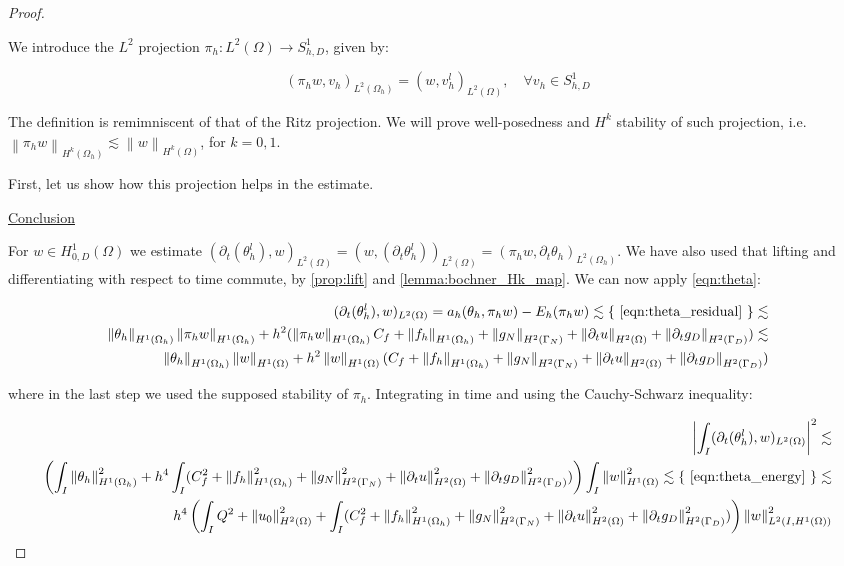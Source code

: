\documentclass[english,a4paper,10pt,oneside]{scrbook}	%
\theoremstyle{break}
\newenvironment{mproof}[1][\proofname]{%
  \begin{proof}[#1]$ $\par\nobreak\ignorespaces
}{%
  \end{proof}
}
\renewcommand*{\proofname}{Proof}
\theoremstyle{remark}
\newcommand{\norm}[1]{\left\lVert#1\right\rVert}
\newcommand{\ind}[1]{\{\text{ #1 }\}}
\begin{document}
\begin{mproof}

We introduce the $L^2$ projection $\pi_h: L^2(\Omega) \rightarrow S^1_{h,D}$, given by:

$$(\pi_h w, v_h)_{L^2(\Omega_h)}=(w, v_h^l)_{L^2(\Omega)},\quad \forall  v_h \in S^1_{h,D}$$

The definition is remimniscent of that of the Ritz projection. We will prove well-posedness and $H^k$ stability of such projection, i.e. $\norm{\pi_h w}_{H^k(\Omega_h)}\lesssim\norm{w}_{H^k(\Omega)}$, for $k=0,1$.

First, let us show how this projection helps in the estimate.

\underline{Conclusion}

For $w \in H^1_{0,D}(\Omega)$ we estimate $(\partial_t(\theta_h^l), w)_{L^2(\Omega)} = (w, (\partial_t\theta_h^l))_{L^2(\Omega)} =  (\pi_h w,\partial_t\theta_h)_{L^2(\Omega_h)}$. We have also used that lifting and differentiating with respect to time commute, by \cref{prop:lift} and \cref{lemma:bochner_Hk_map}. We can now apply \cref{eqn:theta}:

\begin{align*}
	(\partial_t(\theta_h^l), w)_{L^2(\Omega)} = a_h(\theta_h, \pi_h w) - E_h(\pi_h w ) \lesssim \ind{\cref{eqn:theta_residual}}\lesssim\\
	\norm{\theta_h}_{H^1(\Omega_h)} \norm{\pi_h w}_{H^1(\Omega_h)} + h^2 (\norm{\pi_h w }_{H^1(\Omega_h)} C_f + \norm{f_h}_{H^1(\Omega_h)} + \norm{g_N}_{H^2(\Gamma_N)} + \norm{\partial_t u}_{H^2(\Omega)} + \norm{\partial_t g_D}_{H^2(\Gamma_D)} ) \lesssim\\
	\norm{\theta_h}_{H^1(\Omega_h)} \norm{ w}_{H^1(\Omega)} + h^2 \norm{w }_{H^1(\Omega)} (C_f + \norm{f_h}_{H^1(\Omega_h)} + \norm{g_N}_{H^2(\Gamma_N)} + \norm{\partial_t u}_{H^2(\Omega)} + \norm{\partial_t g_D}_{H^2(\Gamma_D)} )
\end{align*}

where in the last step we used the supposed stability of $\pi_h$. Integrating in time and using the Cauchy-Schwarz inequality:

\begin{align*}
	\left | \int_I(\partial_t(\theta_h^l), w)_{L^2(\Omega)} \right |^2 \lesssim\\
	\left (\int_I \norm{\theta_h}_{H^1(\Omega_h)}^2+ h^4 \int_I (C_f^2 + \norm{f_h}_{H^1(\Omega_h)}^2 + \norm{g_N}^2_{H^2(\Gamma_N)} + \norm{\partial_t u}^2_{H^2(\Omega)} + \norm{\partial_t g_D}^2_{H^2(\Gamma_D)} )\right) \int_I\norm{ w}_{H^1(\Omega)}^2 \lesssim \ind{\cref{eqn:theta_energy}} \lesssim\\
	h^4 \left (  \int_I Q^2 + \norm{u_0}_{H^2(\Omega)}^2 + \int_I (C_f^2 +\norm{f_h}_{H^1(\Omega_h)}^2 + \norm{g_N}^2_{H^2(\Gamma_N)} + \norm{\partial_t u}^2_{H^2(\Omega)} + \norm{\partial_t g_D}^2_{H^2(\Gamma_D)} )\right) \norm{w}_{L^2(I,H^1(\Omega))}^2
\end{align*}


\end{mproof}
\end{document}
